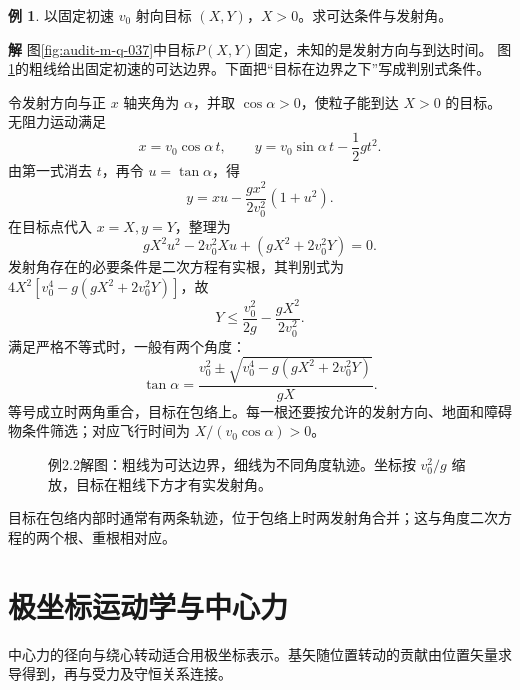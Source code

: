\documentclass[11pt,openany,fontset=fandol]{ctexbook}
\theoremstyle{plain}\newtheorem{theorem}{定理}[chapter]\newtheorem{proposition}[theorem]{命题}
\theoremstyle{definition}\newtheorem{definition}{定义}[chapter]\newtheorem{example}{例}[chapter]
\theoremstyle{remark}\newtheorem*{remark}{说明}
\newcommand{\SolutionStart}{\par\nobreak\medskip\nobreak\noindent\textbf{解}\quad\ignorespaces}
\newenvironment{solution}{\SolutionStart}{\par\medskip}
\begin{document}
\begin{example}
以固定初速 $v_0$ 射向目标 $(X,Y)$，$X>0$。求可达条件与发射角。
\end{example}

\begin{solution}
图\ref{fig:audit-m-q-037}中目标$P(X,Y)$固定，未知的是发射方向与到达时间。
图\ref{fig:eg-2-2}的粗线给出固定初速的可达边界。下面把“目标在边界之下”写成判别式条件。

令发射方向与正 $x$ 轴夹角为 $\alpha$，并取 $\cos\alpha>0$，使粒子能到达 $X>0$ 的目标。无阻力运动满足
\[
x=v_0\cos\alpha\,t,\qquad y=v_0\sin\alpha\,t-\frac12gt^2.
\]
由第一式消去 $t$，再令 $u=\tan\alpha$，得
\[
y=xu-\frac{gx^2}{2v_0^2}(1+u^2).
\]
在目标点代入 $x=X,y=Y$，整理为
\[
gX^2u^2-2v_0^2Xu+(gX^2+2v_0^2Y)=0.
\]
发射角存在的必要条件是二次方程有实根，其判别式为 $4X^2[v_0^4-g(gX^2+2v_0^2Y)]$，故
\[
Y\le\frac{v_0^2}{2g}-\frac{gX^2}{2v_0^2}.
\]
满足严格不等式时，一般有两个角度：
\[
\tan\alpha=\frac{v_0^2\pm\sqrt{v_0^4-g(gX^2+2v_0^2Y)}}{gX}.
\]
等号成立时两角重合，目标在包络上。每一根还要按允许的发射方向、地面和障碍物条件筛选；对应飞行时间为 $X/(v_0\cos\alpha)>0$。

\begin{figure}[H]
\centering
{}
\caption{例2.2解图：粗线为可达边界，细线为不同角度轨迹。坐标按 $v_0^2/g$ 缩放，目标在粗线下方才有实发射角。}\label{fig:eg-2-2}
\end{figure}

目标在包络内部时通常有两条轨迹，位于包络上时两发射角合并；这与角度二次方程的两个根、重根相对应。
\end{solution}

\section{极坐标运动学与中心力}
中心力的径向与绕心转动适合用极坐标表示。基矢随位置转动的贡献由位置矢量求导得到，再与受力及守恒关系连接。
\end{document}

